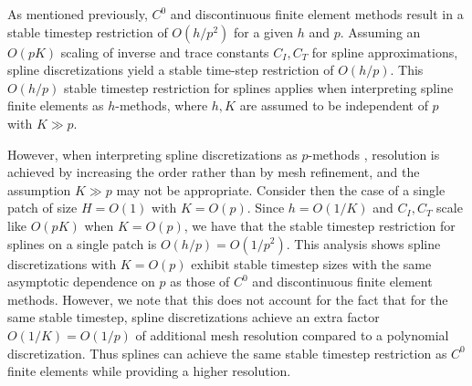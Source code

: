 \documentclass[preprint,10pt]{elsarticle}
\newcommand{\reviewerOne}[1]{#1}
\begin{document}
\reviewerOne{As mentioned previously, $C^0$ and discontinuous finite element methods result in a stable timestep restriction of $O(h/p^2)$ for a given $h$ and $p$.  Assuming an {$O(pK)$} scaling of inverse and trace constants $C_I, C_T$ for spline approximations, spline discretizations yield a stable time-step restriction of $O(h/p)$.  This $O(h/p)$ stable timestep restriction for splines applies when interpreting spline finite elements as $h$-methods, where $h, K$ are assumed to be independent of $p$ with $K \gg p$.  

However, when interpreting spline discretizations as $p$-methods \cite{babuska1981p}, resolution is achieved by increasing the order rather than by mesh refinement, and the assumption $K \gg p$ may not be appropriate.  Consider { then the case of} a single patch of size $H=O(1)$ { with $K = O(p)$.  Since $h = O(1/K)$ and $C_I, C_T$ scale like $O(pK)$ when $K = O(p)$}, we have that the stable timestep restriction for splines on a single patch is $O(h/p) = O(1/p^2)$.  This analysis shows {spline discretizations with $K = O(p)$ exhibit stable timestep sizes with the same asymptotic dependence on $p$ as those of $C^0$ and discontinuous finite element methods}.  However, we note that this does not account for the fact that for the same stable timestep, spline discretizations achieve an extra factor $O(1/K) = O(1/p)$ of additional mesh resolution compared to a polynomial discretization.  Thus splines can achieve the same stable timestep restriction as $C^0$ finite elements while providing a higher resolution.  

}
\end{document}
